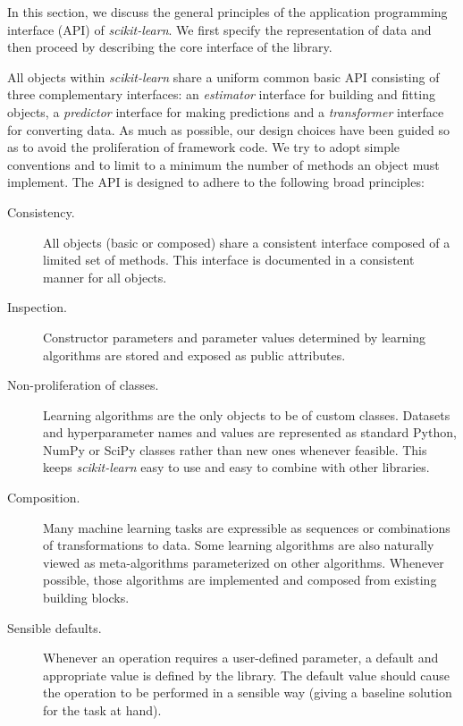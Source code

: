 \documentclass{llncs}
\newcommand{\sklearn}{\textit{scikit-learn}\xspace}
\begin{document}
\label{sec:core-api}

In this section, we discuss the general principles of the application
programming interface (API) of \sklearn. We first specify the representation of
data and then proceed by describing the core interface of the library.

All objects within \sklearn share a uniform common basic API consisting of three
complementary interfaces: an \textit{estimator} interface for building and
fitting objects, a \textit{predictor} interface for making predictions and a
\textit{transformer} interface for converting data. As much as possible, our
design choices have been guided so as to avoid the proliferation of framework
code. We try to adopt simple conventions and to limit to a minimum the number of
methods an object must implement. The API is designed to adhere to the following
broad principles:

\begin{description}
  \item[Consistency.]
       All objects (basic or composed) share a consistent interface composed of
       a limited set of methods. This interface is documented in a consistent
       manner for all objects.
  \item[Inspection.]
       Constructor parameters and parameter values determined by learning
       algorithms are stored and exposed as public attributes.
  \item[Non-proliferation of classes.]
       Learning algorithms are the only objects to be of custom classes.
       Datasets and hyperparameter names and values are represented as standard
       Python, NumPy or SciPy classes rather than new ones whenever feasible.
       This keeps \sklearn easy to use and easy to combine with other libraries.
  \item[Composition.]
       Many machine learning tasks are expressible
       as sequences or combinations of transformations to data.
       Some learning algorithms are also naturally viewed
       as meta-algorithms parameterized on other algorithms.
       Whenever possible, those algorithms are implemented and composed from
       existing building blocks.
  \item[Sensible defaults.]
       Whenever an operation requires a user-defined parameter,
       a default and appropriate value is defined by the library.
       The default value should cause the operation to be performed
       in a sensible way (giving a baseline solution for the task at hand).
\end{description}
\end{document}
